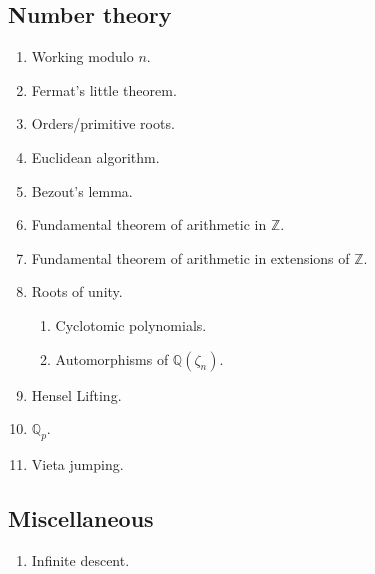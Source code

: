 \documentclass{article}
\begin{document}
\subsection*{Number theory}
\begin{enumerate}
\item Working modulo $n$.
\item Fermat's little theorem.
\item Orders/primitive roots.
\item Euclidean algorithm.
\item Bezout's lemma.
\item Fundamental theorem of arithmetic in $\mathbb{Z}$.
\item Fundamental theorem of arithmetic in extensions of $\mathbb{Z}$.
\item Roots of unity.
\begin{enumerate}
\item Cyclotomic polynomials.
\item Automorphisms of $\mathbb{Q}(\zeta_n)$.
\end{enumerate}
\item Hensel Lifting.
\item $\mathbb{Q}_p$.
\item Vieta jumping.
\end{enumerate}

\subsection*{Miscellaneous}
\begin{enumerate}
\item Infinite descent.
\end{enumerate}
\end{document}
